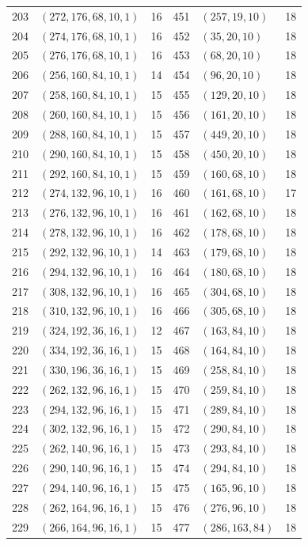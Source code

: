 \begin{longtable}{@{}rlr@{\hspace{12mm}}rlr@{}}
203 & $(272,176,68,10,1)$ & 16 & 451 & $(257,19,10)$ & 18\\
204 & $(274,176,68,10,1)$ & 16 & 452 & $(35,20,10)$ & 18\\
205 & $(276,176,68,10,1)$ & 16 & 453 & $(68,20,10)$ & 18\\
206 & $(256,160,84,10,1)$ & 14 & 454 & $(96,20,10)$ & 18\\
207 & $(258,160,84,10,1)$ & 15 & 455 & $(129,20,10)$ & 18\\
208 & $(260,160,84,10,1)$ & 15 & 456 & $(161,20,10)$ & 18\\
209 & $(288,160,84,10,1)$ & 15 & 457 & $(449,20,10)$ & 18\\
210 & $(290,160,84,10,1)$ & 15 & 458 & $(450,20,10)$ & 18\\
211 & $(292,160,84,10,1)$ & 15 & 459 & $(160,68,10)$ & 18\\
212 & $(274,132,96,10,1)$ & 16 & 460 & $(161,68,10)$ & 17\\
213 & $(276,132,96,10,1)$ & 16 & 461 & $(162,68,10)$ & 18\\
214 & $(278,132,96,10,1)$ & 16 & 462 & $(178,68,10)$ & 18\\
215 & $(292,132,96,10,1)$ & 14 & 463 & $(179,68,10)$ & 18\\
216 & $(294,132,96,10,1)$ & 16 & 464 & $(180,68,10)$ & 18\\
217 & $(308,132,96,10,1)$ & 16 & 465 & $(304,68,10)$ & 18\\
218 & $(310,132,96,10,1)$ & 16 & 466 & $(305,68,10)$ & 18\\
219 & $(324,192,36,16,1)$ & 12 & 467 & $(163,84,10)$ & 18\\
220 & $(334,192,36,16,1)$ & 15 & 468 & $(164,84,10)$ & 18\\
221 & $(330,196,36,16,1)$ & 15 & 469 & $(258,84,10)$ & 18\\
222 & $(262,132,96,16,1)$ & 15 & 470 & $(259,84,10)$ & 18\\
223 & $(294,132,96,16,1)$ & 15 & 471 & $(289,84,10)$ & 18\\
224 & $(302,132,96,16,1)$ & 15 & 472 & $(290,84,10)$ & 18\\
225 & $(262,140,96,16,1)$ & 15 & 473 & $(293,84,10)$ & 18\\
226 & $(290,140,96,16,1)$ & 15 & 474 & $(294,84,10)$ & 18\\
227 & $(294,140,96,16,1)$ & 15 & 475 & $(165,96,10)$ & 18\\
228 & $(262,164,96,16,1)$ & 15 & 476 & $(276,96,10)$ & 18\\
229 & $(266,164,96,16,1)$ & 15 & 477 & $(286,163,84)$ & 18\\

\end{longtable}
